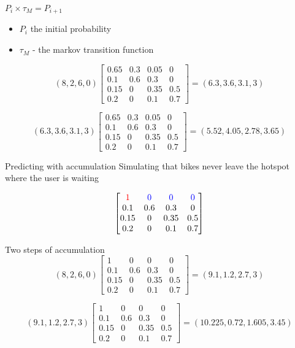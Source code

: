 \begin{frame}
	

	
\begin{center}	
	
$ P_i \times \tau_M = P_{i+1}$\\

\begin{itemize}
	\item \textbf{$ P_i $} the initial probability
	\item \textbf{$ \tau_M $} - the markov transition function 
\end{itemize}
		
		
$$
(8, 2, 6, 0)
\begin{bmatrix}
0.65 & 0.3 & 0.05 & 0\\
0.1  & 0.6 & 0.3  & 0\\
0.15 & 0   & 0.35 & 0.5\\
0.2  & 0   & 0.1  & 0.7
\end{bmatrix}
=
(6.3, 3.6, 3.1, 3)
$$

$$
(6.3, 3.6, 3.1, 3)
\begin{bmatrix}
0.65 & 0.3 & 0.05 & 0\\
0.1  & 0.6 & 0.3  & 0\\
0.15 & 0   & 0.35 & 0.5\\
0.2  & 0   & 0.1  & 0.7
\end{bmatrix}
=
(5.52,4.05,2.78,3.65)
$$

\end{center}
\end{frame}

\begin{frame}{Predicting with accumulation}
Simulating that bikes never leave the hotspot where the user is waiting

$$ \begin{bmatrix}
	{\color{red}1} & {\color{blue}0} & \color{blue} 0& {\color{blue}0}\\
	0.1  & 0.6 & 0.3  & 0\\
	0.15 & 0   & 0.35 & 0.5\\
	0.2  & 0   & 0.1  & 0.7
\end{bmatrix}
 $$
\end{frame}


\begin{frame}{Two steps of accumulation}
$$
(8, 2, 6, 0)
\begin{bmatrix}
1 & 0 & 0 & 0\\
0.1  & 0.6 & 0.3  & 0\\
0.15 & 0   & 0.35 & 0.5\\
0.2  & 0   & 0.1  & 0.7
\end{bmatrix}
=
(9.1,1.2,2.7,3)
$$
	
$$
(9.1,1.2,2.7,3)
\begin{bmatrix}
1 & 0 & 0 & 0\\
0.1  & 0.6 & 0.3  & 0\\
0.15 & 0   & 0.35 & 0.5\\
0.2  & 0   & 0.1  & 0.7
\end{bmatrix}
=
(10.225,0.72,1.605,3.45)
$$
	
\end{frame}

